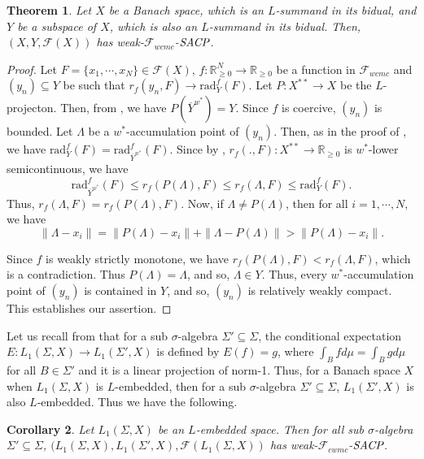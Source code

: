 \documentclass[11pt]{amsart}
\newtheorem{thm}{Theorem}[section]
\newtheorem{cor}[thm]{Corollary}
\newcommand{\ra}{\rightarrow}
\newcommand{\ci}{\subseteq}
\newcommand{\si}{\sigma}
\newcommand{\La}{\Lambda}
\newcommand{\mb}{\mathbb}
\newcommand{\mc}{\mathcal}
\newcommand{\tr}{\textrm}
\newcommand{\mr}{\mathscr}
\newcommand{\Si}{\Sigma}
\newcommand{\trr}{\textrm{rad}}
\newcommand{\eSACP}{\bf{\emph{SACP}}}
\begin{document}
\begin{thm}\label{5}
Let $X$ be a Banach space, which is an $L$-summand in its bidual, and $Y$ be a subspace of $X$, which is also an $L$-summand in its bidual. Then, $(X,Y,\mc{F}(X))$ has weak-$\mr{F}_{wcmc}$-$\eSACP$.
\end{thm}
\begin{proof}
Let $F=\{x_1,\cdots,x_N\}\in \mc{F}(X)$, $f:\mb{R}^N_{\geq0}\ra\mb{R}_{\geq0}$ be a function in $\mr{F}_{wcmc}$  and $(y_n)\ci Y$ be such that $r_f(y_n,F)\ra\tr{rad}_Y^f(F)$. Let $P:X^{**}\ra X$ be the $L$-projecton. Then, from \cite[Theorem~1.2]{H}, we have $P(\overline{Y}^{w^*})=Y$. Since $f$ is coercive, $(y_n)$ is bounded. Let $\La$ be a $w^*$-accumulation point of $(y_n)$. Then, as in the proof of \cite[Theorem~3.5(a)]{ST}, we have $\trr_Y^f(F)=\trr_{\overline{Y}^{w^*}}^f(F)$. Since by \cite[Thorem~1.4(iv)]{LV}, $r_f(.,F):X^{**}\ra\mb{R}_{\geq0}$ is $w^*$-lower semicontinuous, we have 
\[\trr_{\overline{Y}^{w^*}}^f(F)\leq r_f(P(\La),F)\leq r_f(\La,F)\leq\trr_Y^f(F).\]
Thus, $r_f(\La,F)=r_f(P(\La),F)$. Now, if $\La\neq P(\La)$, then for all $i=1,\cdots,N$, we have
\[\|\La-x_i\|=\|P(\La)-x_i\|+\|\La-P(\La)\|>\|P(\La)-x_i\|.\]

Since $f$ is weakly strictly monotone, we have $r_f(P(\La),F)<r_f(\La,F)$, which is a contradiction. Thus $P(\La)=\La$, and so, $\La\in Y$. Thus, every $w^*$-accumulation point of $(y_n)$ is contained in $Y$, and so, $(y_n)$ is relatively weakly compact. This establishes our assertion.
\end{proof}
Let us recall from \cite[Chapter~5]{JD} that for a sub $\si$-algebra $\Si'\ci \Si$, the conditional expectation $E:L_1(\Si,X)\ra L_1(\Si',X)$ is defined by $E(f)=g$, where $\int_Bfd\mu=\int_Bgd\mu$ for all $B\in\Si'$ and it is a linear projection of norm-1. Thus, for a Banach space $X$ when $L_1(\Si,X)$ is $L$-embedded, then for a sub $\si$-algebra $\Si'\ci \Si$, $L_1(\Si',X)$ is also $L$-embedded. Thus we have the following.
\begin{cor}
Let $L_1(\Si,X)$ be an $L$-embedded space. Then for all sub $\si$-algebra $\Si'\ci \Si$, $(L_1(\Si,X),L_1(\Si',X),\mc{F}(L_1(\Si,X))$ has weak-$\mr{F}_{cwmc}$-$\eSACP$.
\end{cor}
\end{document}
